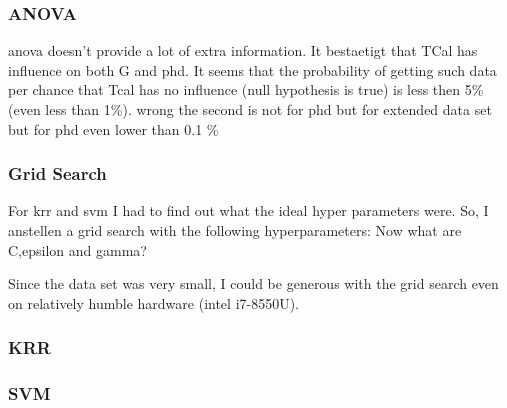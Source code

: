 \subsubsection{ANOVA}\label{sec:res-anova}
\Gls{anova} doesn't provide a lot of extra information. 
It bestaetigt that TCal has influence on both G and phd. 
It seems that the probability of getting such data per chance that Tcal has no influence 
(null hypothesis is true) is less then 5\% (even less than 1\%). 
wrong the second is not for phd but for extended data set
but for phd even lower than 0.1 \%

\iffalse
\subsubsection{Grid Search}
For \gls{krr} and {svm} I had to find out what the ideal hyper parameters were. 
So, I anstellen a grid search with the following hyperparameters: 
Now what are C,epsilon and gamma? 

Since the data set was very small, I could be generous with the grid search even on relatively humble hardware (intel i7-8550U). 

\subsubsection{KRR}

\subsubsection{SVM}

